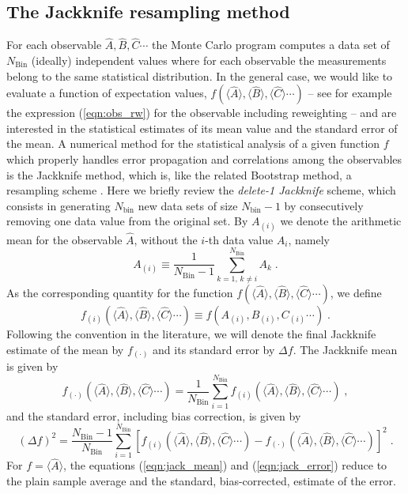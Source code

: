 \subsection{The Jackknife resampling method}\label{sec:jack}
%
For each observable $\hat{A}, \hat{B},\hat{C} \cdots$ the Monte Carlo program computes a data set of $N_{\text{Bin}}$ (ideally) independent values where for each observable the measurements belong to the same  statistical distribution.  In the general case, we would like to evaluate a function of expectation values, $f(\langle \hat{A} \rangle, \langle \hat{B} \rangle, \langle \hat{C} \rangle  \cdots)$ --
see for example the expression (\ref{eqn:obs_rw}) for the observable including reweighting --
and are interested in the statistical estimates of its mean value  and the standard error of the mean.
A numerical method for the statistical analysis of a given function $f$ which properly handles error propagation and correlations among the observables is the Jackknife method, which is, like the related Bootstrap method, a resampling scheme \cite{efron1981}.
Here we briefly review the \textit{delete-1 Jackknife} scheme, which consists in generating $N_{\text{bin}}$ new data sets of size $N_{\text{bin}}-1$ by consecutively removing one data value from the original set. By $A_{(i)}$ we denote the arithmetic mean for the observable $\hat{A}$, without the $i$-th data value $A_{i}$, namely
\begin{equation}
A_{(i)} \equiv \frac{1}{N_{\text{Bin}}-1} \sum\limits_{k=1,\,k\neq i}^{N_{\text{Bin}}} A_{k}\;.
\end{equation}
As the corresponding quantity for  the function $f(\langle \hat{A} \rangle, \langle \hat{B} \rangle, \langle \hat{C} \rangle  \cdots)$, we define 
\begin{equation}
f_{(i)}(\langle \hat{A} \rangle, \langle \hat{B} \rangle, \langle \hat{C} \rangle  \cdots) \equiv
f( A_{(i)}, B_{(i)},C_{(i)}\cdots)\;.
\end{equation}
Following the convention in the literature, we will denote the final Jackknife estimate of the mean by $f_{(\cdot)}$ and its standard error by $\Delta f$. The Jackknife mean is  given by
\begin{equation}
\label{eqn:jack_mean}
f_{(\cdot)}(\langle \hat{A} \rangle, \langle \hat{B} \rangle, \langle \hat{C} \rangle  \cdots) =
\frac{1}{N_{\text{Bin}}}\sum\limits_{i=1}^{N_{\text{Bin}}} f_{(i)}(\langle \hat{A} \rangle, \langle \hat{B} \rangle, \langle \hat{C} \rangle  \cdots)\;,
\end{equation}
and the standard error, including bias correction, is given by
\begin{equation}
\label{eqn:jack_error}
(\Delta f)^{2} = 
\frac{N_{\text{Bin}}-1}{N_{\text{Bin}}} \sum\limits_{i=1}^{N_{\text{Bin}}}
\left[f_{(i)}(\langle \hat{A} \rangle, \langle \hat{B} \rangle, \langle \hat{C} \rangle  \cdots)
- f_{(\cdot)}(\langle \hat{A} \rangle, \langle \hat{B} \rangle, \langle \hat{C} \rangle  \cdots)\right]^{2}\;.
\end{equation}
For $f=\langle\hat A\rangle$, the equations (\ref{eqn:jack_mean}) and (\ref{eqn:jack_error}) reduce to the plain sample average and the standard, bias-corrected, estimate of the error.

